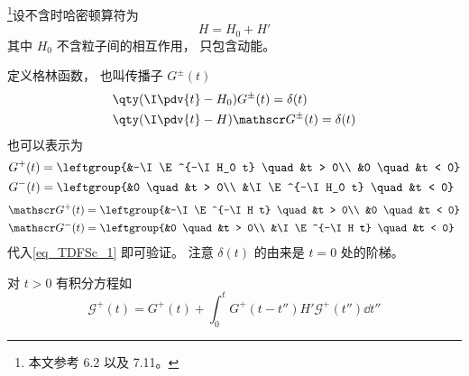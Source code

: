 
\footnote{本文参考 \cite{Newton} 6.2 以及 \cite{Sakurai} 7.11。}设不含时哈密顿算符为
\begin{equation}
H = H_0 + H'
\end{equation}
其中 $H_0$ 不含粒子间的相互作用， 只包含动能。

定义格林函数， 也叫传播子 $G^\pm(t)$
\begin{equation}\label{eq_TDFSc_1}
\begin{aligned}
&\qty(\I\pdv{t} - H_0)G^\pm (t) = \delta(t)\\
&\qty(\I\pdv{t} - H)\mathscr G^\pm (t) = \delta(t)
\end{aligned}
\end{equation}
也可以表示为
\begin{equation}
\begin{aligned}
&G^+(t) = \leftgroup{&-\I \E^{-\I H_0 t} \quad &t > 0\\
&0 \quad &t < 0}\\
&G^-(t) = \leftgroup{&0 \quad &t > 0\\
&\I \E^{-\I H_0 t} \quad &t < 0}
\end{aligned}
\end{equation}
\begin{equation}
\begin{aligned}
&\mathscr G^+(t) = \leftgroup{&-\I \E^{-\I H t} \quad &t > 0\\
&0 \quad &t < 0}\\
&\mathscr G^-(t) = \leftgroup{&0 \quad &t > 0\\
&\I \E^{-\I H t} \quad &t < 0}
\end{aligned}
\end{equation}
代入\autoref{eq_TDFSc_1} 即可验证。 注意 $\delta(t)$ 的由来是 $t=0$ 处的阶梯。

对 $t>0$ 有积分方程如
\begin{equation}
\mathscr G^+(t) = G^+(t) + \int_0^t G^+(t-t'')H'\mathscr G^+(t'')\dd{t''}
\end{equation}
